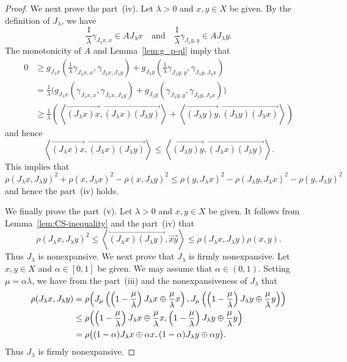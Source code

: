 \documentclass[draft]{amsart}
\numberwithin{equation}{section}
\newcommand{\ip}[2]{\left\langle #1, #2 \right\rangle}
\theoremstyle{plain}
\theoremstyle{definition}
\theoremstyle{remark}
\begin{document}
\begin{proof}
 We next prove the part~(iv). Let $\lambda>0$ and $x,y\in X$ be given. 
 By the definition of $J_{\lambda}$, we have 
 \[
  \frac{1}{\lambda}\gamma_{J_{\lambda}x, x} \in AJ_{\lambda}x 
  \quad \textrm{and} \quad 
  \frac{1}{\lambda}\gamma_{J_{\lambda}y, y} \in AJ_{\lambda}y.  
 \]
 The monotonicity of $A$ and Lemma~\ref{lem:g_p-ql} imply that 
 \begin{align*}
  0
 &\geq g_{J_{\lambda}x}\left(
  \frac{1}{\lambda}\gamma_{J_{\lambda}x, x}, \gamma_{J_{\lambda}x, J_{\lambda}y}
 \right)
  + g_{J_{\lambda}y}\left(
  \frac{1}{\lambda}\gamma_{J_{\lambda}y, y}, \gamma_{J_{\lambda}y, J_{\lambda}x}
 \right) \\
 &= \frac{1}{\lambda} \bigl(g_{J_{\lambda}x}\left(
  \gamma_{J_{\lambda}x, x}, \gamma_{J_{\lambda}x, J_{\lambda}y}
 \right)
  + g_{J_{\lambda}y}\left(
  \gamma_{J_{\lambda}y, y}, \gamma_{J_{\lambda}y, J_{\lambda}x}
 \right)
  \bigr) \\
 &\geq \frac{1}{\lambda} \left(
   \ip{\overrightarrow{(J_{\lambda}x)x}}{\overrightarrow{(J_{\lambda}x)(J_{\lambda}y)}}
 + \ip{\overrightarrow{(J_{\lambda}y)y}}{\overrightarrow{(J_{\lambda}y)(J_{\lambda}x)}} 
  \right) 
 \end{align*}
 and hence 
 \[
  \ip{\overrightarrow{(J_{\lambda}x)x}}{\overrightarrow{(J_{\lambda}x)(J_{\lambda}y)}}
  \leq \ip{\overrightarrow{(J_{\lambda}y)y}}{\overrightarrow{(J_{\lambda}x)(J_{\lambda}y)}}. 
 \]
 This implies that 
 \[
  \rho(J_{\lambda}x, J_{\lambda}y)^2 + \rho(x, J_{\lambda}x)^2 - \rho(x, J_{\lambda}y)^2 
  \leq 
  \rho(y, J_{\lambda}x)^2 - \rho(J_{\lambda}y, J_{\lambda}x)^2 - \rho(y, J_{\lambda}y)^2
 \]
 and hence the part~(iv) holds. 

 We finally prove the part~(v). Let $\lambda>0$ and $x,y\in X$ be given. 
 It follows from Lemma~\ref{lem:CS-inequality} and the part~(iv) 
 that 
 \[
  \rho(J_{\lambda}x, J_{\lambda}y)^2
  \leq \ip{\overrightarrow{(J_{\lambda}x)(J_{\lambda}y)}}
  {\overrightarrow{xy}} 
  \leq \rho(J_{\lambda}x, J_{\lambda}y) \rho(x, y). 
 \]
 Thus $J_{\lambda}$ is nonexpansive. 
 We next prove that $J_{\lambda}$ is firmly nonexpansive. 
 Let $x,y\in X$ and $\alpha\in [0,1]$ be given. 
 We may assume that $\alpha \in (0,1)$. 
 Setting $\mu=\alpha \lambda$, we have 
 from the part~(iii) and the nonexpansiveness of $J_{\lambda}$ that 
 \begin{align*}
  \rho(J_{\lambda}x, J_{\lambda}y) 
  &=\rho\Bigl(
 J_{\mu}\left(\left(1-\frac{\mu}{\lambda}\right)J_{\lambda}x 
 \oplus \frac{\mu}{\lambda}x\right), 
 J_{\mu}\left(\left(1-\frac{\mu}{\lambda}\right)J_{\lambda}y 
 \oplus \frac{\mu}{\lambda}y\right)
 \Bigr) \\
  &\leq \rho\Bigl(\left(1-\frac{\mu}{\lambda}\right)J_{\lambda}x 
 \oplus \frac{\mu}{\lambda}x, 
 \left(1-\frac{\mu}{\lambda}\right)J_{\lambda}y 
 \oplus \frac{\mu}{\lambda}y
 \Bigr) \\
  &= \rho\bigl(
(1-\alpha)J_{\lambda}x \oplus \alpha x, 
(1-\alpha)J_{\lambda}y \oplus \alpha y
\bigr). 
 \end{align*}
 Thus $J_{\lambda}$ is firmly nonexpansive. 
\end{proof}
\end{document}
